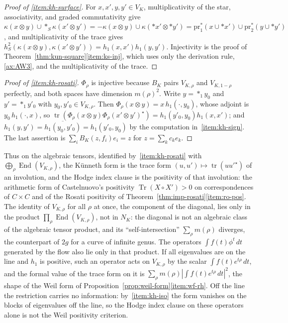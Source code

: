 \documentclass[11pt]{amsart}
\theoremstyle{plain}
\theoremstyle{definition}
\theoremstyle{remark}
\numberwithin{equation}{section}
\DeclareMathOperator{\Tr}{Tr}
\DeclareMathOperator{\tr}{tr}
\begin{document}
\begin{proof}[Proof of \ref{item:kh-surface}]
For $x,x',y,y'\in V_K$, multiplicativity of the star, associativity, and
graded commutativity give $\kappa(x\otimes y)\cup*_S\kappa(x'\otimes
y')=-\kappa(x\otimes y)\cup\kappa(*x'\otimes*y')=\mathrm{pr}_1^*(x\cup
*x')\cup\mathrm{pr}_2^*(y\cup*y')$, and multiplicativity of the trace
gives $h_S^2(\kappa(x\otimes y),\kappa(x'\otimes y'))=
h_1(x,x')h_1(y,y')$. Injectivity is the proof of
Theorem~\ref{thm:kun-square}\ref{item:ks-inj}, which uses only the
derivation rule, \ref{ax:AW3}, and the multiplicativity of the trace.
\end{proof}

\begin{proof}[Proof of \ref{item:kh-rosati}]
$\Phi_\rho$ is injective because $B_K$ pairs $V_{K,\rho}$ and
$V_{K,1-\rho}$ perfectly, and both spaces have dimension $m(\rho)^2$.
Write $y=*_1y_0$ and $y'=*_1y'_0$ with $y_0,y'_0\in V_{K,\rho}$. Then
$\Phi_\rho(x\otimes y)=x\,h_1(\cdot,y_0)$, whose adjoint is
$y_0\,h_1(\cdot,x)$, so $\tr(\Phi_\rho(x\otimes y)\Phi_\rho(x'\otimes
y')^\star)=h_1(y'_0,y_0)h_1(x,x')$; and
$h_1(y,y')=\overline{h_1(y_0,y'_0)}=h_1(y'_0,y_0)$ by the computation
in~\ref{item:kh-sign}. The last assertion is
$\sum_iB_K(z,f_i)e_i=z$ for $z=\sum_kc_ke_k$.
\end{proof}

Thus on the algebraic tensors, identified by~\ref{item:kh-rosati} with
$\bigoplus_\rho\operatorname{End}(V_{K,\rho})$, the K\"unneth form is the
trace form $(u,u')\mapsto\tr(uu'^\star)$ of an involution, and the Hodge
index clause is the positivity of that involution: the arithmetic form
of Castelnuovo's positivity $\Tr(X\circ X')>0$ on correspondences of
$C\times C$ and of the Rosati positivity of
Theorem~\ref{thm:imp-rosati}\ref{item:ro-pos}. The identity of
$V_{K,\rho}$ for all $\rho$ at once, the component of the diagonal,
lies only in the product $\prod_\rho\operatorname{End}(V_{K,\rho})$,
not in $N_K$: the diagonal is not an algebraic class of the algebraic
tensor product, and its ``self-intersection'' $\sum_\rho m(\rho)$
diverges, the counterpart of $2g$ for a curve of infinite genus. The
operators $\int f(t)\phi^t\,dt$ generated by the flow also lie only in
that product. If all eigenvalues are on the line and $h_1$ is positive,
such an operator acts on $V_{K,\rho}$ by the scalar $\int
f(t)e^{t\rho}\,dt$, and the formal value of the trace form on it is
$\sum_\rho m(\rho)|\int f(t)e^{t\rho}\,dt|^2$, the shape of the Weil
form of Proposition~\ref{prop:weil-form}\ref{item:wf-rh}. Off the line
the restriction carries no information: by~\ref{item:kh-iso} the form
vanishes on the blocks of eigenvalues off the line, so the Hodge index
clause on these operators alone is not the Weil positivity criterion.
\end{document}
